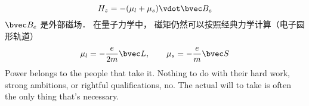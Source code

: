 
\begin{equation}
H_z = -(\mu_l + \mu_s) \vdot \bvec B_{e}
\end{equation}
$\bvec B_e$ 是外部磁场． 在量子力学中， 磁矩仍然可以按照经典力学计算（电子圆形轨道）
\begin{equation}
\mu_l = -\frac{e}{2m} \bvec L, \qquad
\mu_s = -\frac{e}{m} \bvec S
\end{equation}
Power belongs to the people that take it. Nothing to do with their hard work, strong ambitions, or rightful qualifications, no. The actual will to take is often the only thing that's necessary.